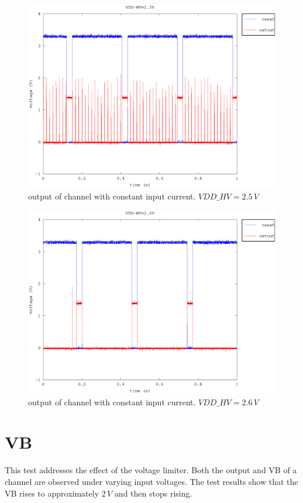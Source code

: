 \documentclass{article}
\begin{document}
\begin{figure}[H]
	\centering
	\includegraphics[width=0.8\linewidth]{fig/out_2-5V.eps}
	\caption{output of channel with constant input current. $VDD\_HV=2.5\,V$}
	\label{fig:out_2-5V}
\end{figure}



\begin{figure}[H]
	\centering
	\includegraphics[width=0.8\linewidth]{fig/out_2-6V.eps}
	\caption{output of channel with constant input current. $VDD\_HV=2.6\,V$}
	\label{fig:out_2-6V}
\end{figure}

\section{VB}
This test addresses the effect of the voltage limiter. Both the output and VB of a channel are observed under varying input voltages. The test results show that the VB rises to approximately $2\,V$ and then stops rising.
\end{document}
